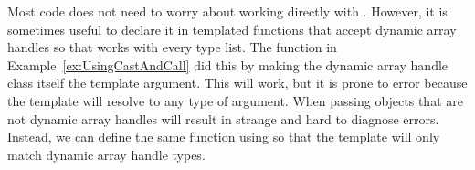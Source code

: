 Most code does not need to worry about working directly with
. However, it is sometimes useful to
declare it in templated functions that accept dynamic array handles so that
works with every type list. The function in
Example~\ref{ex:UsingCastAndCall} did this by making the dynamic array
handle class itself the template argument. This will work, but it is prone
to error because the template will resolve to any type of argument. When
passing objects that are not dynamic array handles will result in strange
and hard to diagnose errors. Instead, we can define the same function using
 so that the template will only match
dynamic array handle types.




